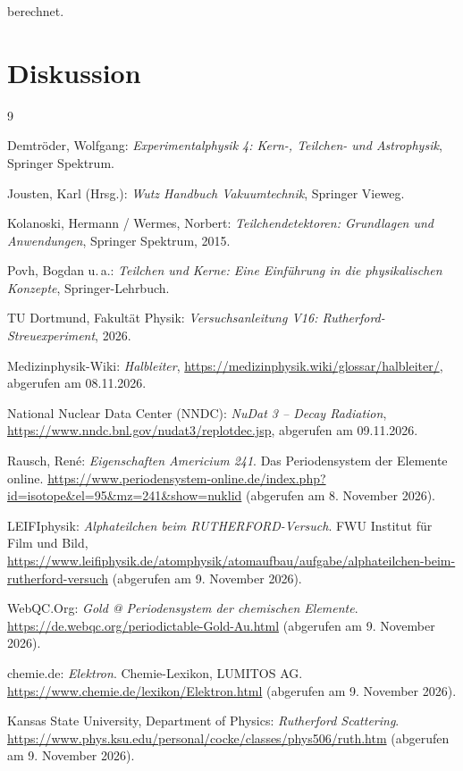 berechnet.



\newpage
\section{Diskussion}

\newpage

\begin{thebibliography}{9}

Demtröder, Wolfgang: \emph{Experimentalphysik 4: Kern-, Teilchen- und Astrophysik}, Springer Spektrum.

Jousten, Karl (Hrsg.): \emph{Wutz Handbuch Vakuumtechnik}, Springer Vieweg.

Kolanoski, Hermann / Wermes, Norbert: \emph{Teilchendetektoren: Grundlagen und Anwendungen}, Springer Spektrum, 2015.

Povh, Bogdan u.\,a.: \emph{Teilchen und Kerne: Eine Einführung in die physikalischen Konzepte}, Springer-Lehrbuch.

TU Dortmund, Fakultät Physik: \emph{Versuchsanleitung V16: Rutherford-Streuexperiment}, 2026.

Medizinphysik-Wiki: \emph{Halbleiter},
\url{https://medizinphysik.wiki/glossar/halbleiter/},
abgerufen am 08.11.2026.

National Nuclear Data Center (NNDC): \emph{NuDat 3 -- Decay Radiation},
\url{https://www.nndc.bnl.gov/nudat3/replotdec.jsp},
abgerufen am 09.11.2026.

Rausch, René: \emph{Eigenschaften Americium 241}.
Das Periodensystem der Elemente online.
\url{https://www.periodensystem-online.de/index.php?id=isotope&el=95&mz=241&show=nuklid}
(abgerufen am 8. November 2026).

LEIFIphysik: \emph{Alphateilchen beim RUTHERFORD-Versuch}.
FWU Institut für Film und Bild,
\url{https://www.leifiphysik.de/atomphysik/atomaufbau/aufgabe/alphateilchen-beim-rutherford-versuch}
(abgerufen am 9. November 2026).

WebQC.Org: \emph{Gold @ Periodensystem der chemischen Elemente}.
\url{https://de.webqc.org/periodictable-Gold-Au.html}
(abgerufen am 9. November 2026).

chemie.de: \emph{Elektron}. Chemie-Lexikon, LUMITOS AG.
\url{https://www.chemie.de/lexikon/Elektron.html}
(abgerufen am 9. November 2026).

Kansas State University, Department of Physics:
\emph{Rutherford Scattering}.
\url{https://www.phys.ksu.edu/personal/cocke/classes/phys506/ruth.htm}
(abgerufen am 9. November 2026).

\end{thebibliography}

